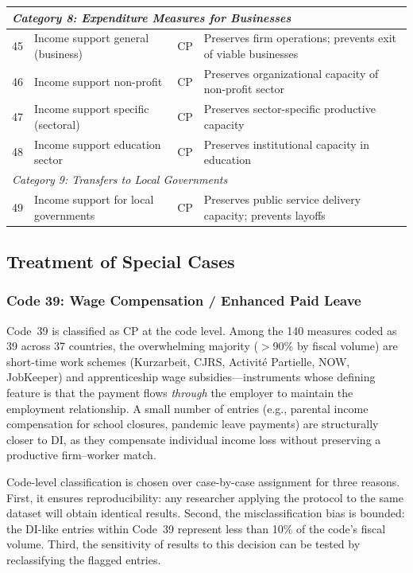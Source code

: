 \documentclass[12pt]{article}
\begin{document}
\begin{small}
\begin{longtable}{p{0.6cm} p{5.8cm} p{1.2cm} p{5.5cm}}
\multicolumn{4}{l}{\textit{Category 8: Expenditure Measures for Businesses}} \\
\midrule
45 & Income support general (business) & CP & Preserves firm operations; prevents exit of viable businesses \\
46 & Income support non-profit & CP & Preserves organizational capacity of non-profit sector \\
47 & Income support specific (sectoral) & CP & Preserves sector-specific productive capacity \\
48 & Income support education sector & CP & Preserves institutional capacity in education \\
\midrule

\multicolumn{4}{l}{\textit{Category 9: Transfers to Local Governments}} \\
\midrule
49 & Income support for local governments & CP & Preserves public service delivery capacity; prevents layoffs \\

\end{longtable}
\end{small}


\subsection{Treatment of Special Cases}

\subsubsection{Code 39: Wage Compensation / Enhanced Paid Leave}
\label{sec:code39_detail}

Code~39 is classified as CP at the code level. Among the 140 measures coded as 39 across 37 countries, the overwhelming majority ($>$90\% by fiscal volume) are short-time work schemes (Kurzarbeit, CJRS, Activit\'{e} Partielle, NOW, JobKeeper) and apprenticeship wage subsidies---instruments whose defining feature is that the payment flows \emph{through} the employer to maintain the employment relationship. A small number of entries (e.g., parental income compensation for school closures, pandemic leave payments) are structurally closer to DI, as they compensate individual income loss without preserving a productive firm--worker match.

Code-level classification is chosen over case-by-case assignment for three reasons. First, it ensures reproducibility: any researcher applying the protocol to the same dataset will obtain identical results. Second, the misclassification bias is bounded: the DI-like entries within Code~39 represent less than 10\% of the code's fiscal volume. Third, the sensitivity of results to this decision can be tested by reclassifying the flagged entries.
\end{document}
